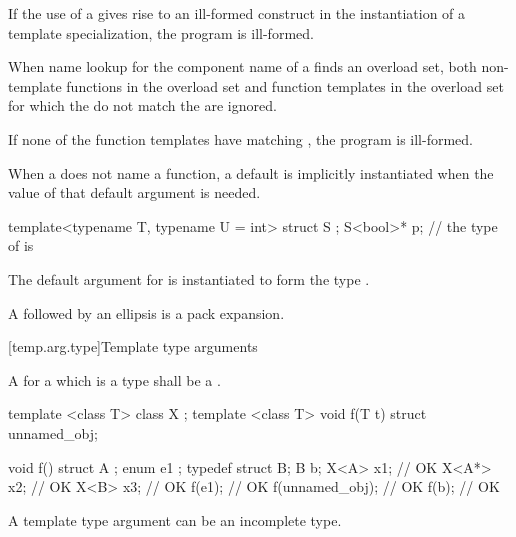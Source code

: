 \pnum
If the use of a
gives rise to an ill-formed construct in the instantiation of a
template specialization, the program is ill-formed.

\pnum
When name lookup for the component name of a
finds an overload set, both non-template functions in the overload
set and function templates in the overload set for
which the
do not match the
are ignored.
\begin{note}
If none of the function templates have matching
,
the program is ill-formed.
\end{note}

\pnum
When a  does not name a function,
a default  is
implicitly instantiated
when the value of that default argument is needed.
\begin{example}
\begin{codeblock}
template<typename T, typename U = int> struct S { };
S<bool>* p;         // the type of  is 
\end{codeblock}
The default argument for  is instantiated to form the type .
\end{example}

\pnum
A  followed by an ellipsis is
a pack expansion.

[temp.arg.type]{Template type arguments}

\pnum
A
for a
which is a type
shall be a
.

\pnum
\begin{example}
\begin{codeblock}
template <class T> class X { };
template <class T> void f(T t) { }
struct { } unnamed_obj;

void f() {
  struct A { };
  enum { e1 };
  typedef struct { } B;
  B b;
  X<A> x1;          // OK
  X<A*> x2;         // OK
  X<B> x3;          // OK
  f(e1);            // OK
  f(unnamed_obj);   // OK
  f(b);             // OK
}
\end{codeblock}
\end{example}
\begin{note}
A template type argument can be an incomplete type.
\end{note}

